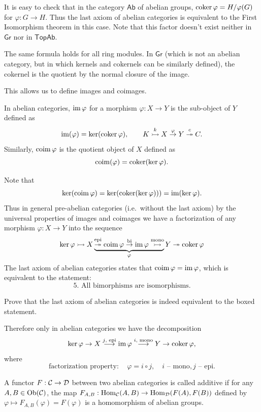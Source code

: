 \begin{example}
    It is easy to check that in the category $\mathsf{Ab}$ of abelian groups, $\operatorname{coker}\varphi=H/\varphi(G)$ for $\varphi:G\to H$. Thus the last axiom of abelian categories is equivalent to the First Isomorphism theorem in this case. Note that this factor doesn't exist neither in $\mathsf{Gr}$ nor in $\mathsf{TopAb}$.
    
    The same formula holds for all ring modules. In $\mathsf{Gr}$ (which is not an abelian category, but in which kernels and cokernels can be similarly defined), the cokernel is the quotient by the normal closure of the image.
\end{example}

This allows us to define images and coimages.

\begin{defn}
    In abelian categories, $\operatorname{im}\varphi$ for a morphism $\varphi:X\to Y$ is the sub-object of $Y$ defined as
    \[\operatorname{im}(\varphi)=\ker(\operatorname{coker}\varphi),\quad\quad K\overset k \rightarrowtail X\overset\varphi\to Y\overset c\twoheadrightarrow C.\]
    Similarly, $\operatorname{coim}\varphi$ is the quotient object of $X$ defined as 
    \[\operatorname{coim}(\varphi)=\operatorname{coker}(\ker\varphi).\]
\end{defn}

Note that
\[\ker(\operatorname{coim}\varphi)=\ker(\operatorname{coker}(\ker\varphi)))=\operatorname{im}(\ker\varphi).\]
Thus in general pre-abelian categories (i.e.\ without the last axiom) by the universal properties of images and coimages we have a factorization of any morphism $\varphi:X\to Y$ into the sequence
\[\ker\varphi\rightarrowtail X\underbrace{\overset{\text{epi}}\twoheadrightarrow\operatorname{coim}\varphi\overset{\text{bi}}\to\operatorname{im}\varphi\overset{\text{mono}}\rightarrowtail}_\varphi Y\twoheadrightarrow\operatorname{coker}\varphi \]
The last axiom of abelian categories states that $\operatorname{coim}\varphi = \operatorname{im}\varphi$, which is equivalent to the statement:
\[\boxed{\text{5. All bimorphisms are isomorphisms.}}\]
\begin{xca}
    Prove that the last axiom of abelian categories is indeed equivalent to the boxed statement.
\end{xca}
Therefore only in abelian categories we have the decomposition
\[\ker\varphi\to X \overset{j\text{, epi}}\longrightarrow\operatorname{im}\varphi\overset{i\text{, mono}}\longrightarrow Y\to \operatorname{coker}\varphi,\]
where
\[\text{factorization property}:\quad \varphi=i\circ j,\quad i\text{ -- mono}, j\text{ -- epi}.\]

\begin{defn}
    A functor $F:\mathcal{C}\to\mathcal{D}$ between two abelian categories is called additive if for any $A,B\in\operatorname{Ob}(\mathcal{C})$, the map $F_{A,B}:\operatorname{Hom}_{\mathcal{C}}(A,B)\to \operatorname{Hom}_{\mathcal{D}}(F(A),F(B))$ defined by $\varphi\mapsto F_{A,B}(\varphi)=F(\varphi)$ is a homomorphism of abelian groups.
\end{defn}

